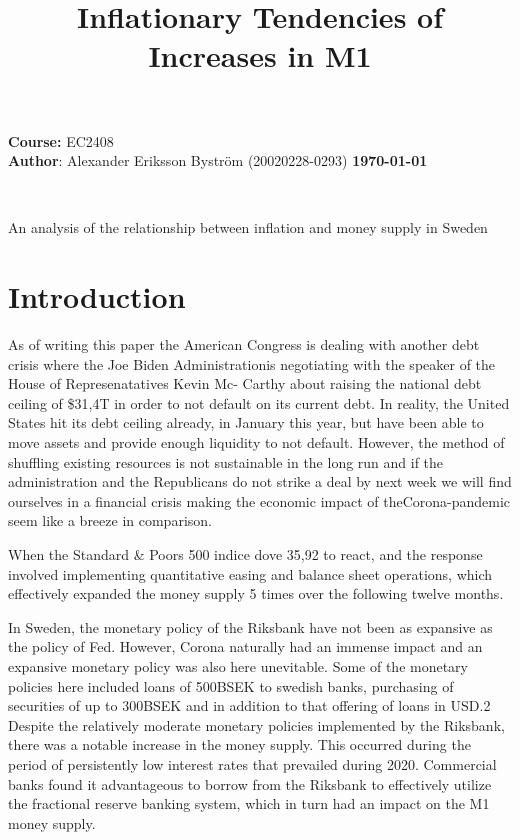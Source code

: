 \documentclass{article}
\title{Inflationary Tendencies of Increases in M1}
\date{}
\makeatletter
\renewcommand{\maketitle}{%
  \begin{mdframed}[style=titlestyle]
    \vspace*{0.5in}
    \hspace*{\dimexpr-\leftmargin-\oddsidemargin--1in}\raggedright %
    \textbf{\LARGE\@title} \\
    \hspace*{\dimexpr-\leftmargin-\oddsidemargin--1in}\raggedright %
     An analysis of the relationship between inflation and money supply in Sweden \\
    \vspace*{0.5in}
  \end{mdframed}
  \thispagestyle{empty}}
\makeatother
\begin{document}
\textcolor{mydarkblue}{\textbf{Course: }EC2408} \\
\textcolor{mydarkblue}{\textbf{Author}: Alexander Eriksson Byström (20020228-0293)}
\hspace*{5cm}\textcolor{mydarkblue}{\textbf{\today}} 

    \maketitle

    \vspace*{1cm}
    \section*{Introduction}
    As of writing this paper the American Congress is dealing with another debt crisis where the Joe
    Biden Administrationis negotiating with the speaker of the House of Represenatatives Kevin Mc-
    Carthy about raising the national debt ceiling of \$31,4T in order to not default on its current debt.
    In reality, the United States hit its debt ceiling already, in January this year, but have been able to
    move assets and provide enough liquidity to not default. However, the method of shuffling existing
    resources is not sustainable in the long run and if the administration and the Republicans do not
    strike a deal by next week we will find ourselves in a financial crisis making the economic impact of
    theCorona-pandemic seem like a breeze in comparison.

    When the Standard \& Poors 500 indice dove 35,92%
    to react, and the response involved implementing quantitative easing and balance sheet operations,
    which effectively expanded the money supply 5 times over the following twelve months.

    In Sweden, the monetary policy of the Riksbank have not been as expansive as the policy of Fed.
    However, Corona naturally had an immense impact and an expansive monetary policy was also
    here unevitable. Some of the monetary policies here included loans of 500BSEK to swedish banks,
    purchasing of securities of up to 300BSEK and in addition to that offering of loans in USD.2 Despite
    the relatively moderate monetary policies implemented by the Riksbank, there was a notable increase
    in the money supply. This occurred during the period of persistently low interest rates that prevailed
    during 2020. Commercial banks found it advantageous to borrow from the Riksbank to effectively
    utilize the fractional reserve banking system, which in turn had an impact on the M1 money supply.
\end{document}
